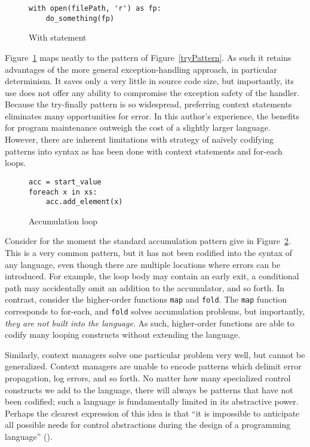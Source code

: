 \documentclass[11pt]{article}
\begin{document}
\begin{figure}[H]
\caption{With statement}
\label{withStatement}
\begin{verbatim}
with open(filePath, 'r') as fp:
    do_something(fp)
\end{verbatim}
\end{figure}

Figure~\ref{withStatement} maps neatly to the pattern of Figure~\ref{tryPattern}.
As such it retains advantages of the more general exception-handling approach, in particular determinism.
It saves only a very little in source code size, but importantly, its use does not offer any ability to compromise the exception safety of the handler.
Because the try-finally pattern is so widespread, preferring context statements eliminates many opportunities for error.
In this author's experience, the benefits for program maintenance outweigh the cost of a slightly larger language.
However, there are inherent limitations with strategy of na\"ively codifying patterns into syntax as has been done with context statements and for-each loops.

\begin{figure}[H]
\caption{Accumulation loop}
\label{accumLoop}
\begin{verbatim}
acc = start_value
foreach x in xs:
    acc.add_element(x)
\end{verbatim}
\end{figure}

Consider for the moment the standard accumulation pattern give in Figure~\ref{accumLoop}.
This is a very common pattern, but it has not been codified into the syntax of any language, even though there are multiple locations where errors can be introduced.
For example, the loop body may contain an early exit, a conditional path may accidentally omit an addition to the accumulator, and so forth.
In contrast, consider the higher-order functions \texttt{map} and \texttt{fold}.
The \texttt{map} function corresponds to for-each, and \texttt{fold} solves accumulation problems, but importantly, \emph{they are not built into the language}.
As such, higher-order functions are able to codify many looping constructs without extending the language.

Similarly, context managers solve one particular problem very well, but cannot be generalized.
Context managers are unable to encode patterns which delimit error propagation, log errors, and so forth.
No matter how many specialized control constructs we add to the language, there will always be patterns that have not been codified; such a language is fundamentally limited in its abstractive power.
Perhaps the clearest expression of this idea is that ``it is impossible to anticipate all possible needs for control abstractions during the design of a programming language'' (\cite{ControlDelimitersHierarchy}).
\end{document}
